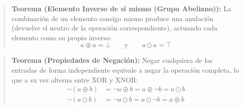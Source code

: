 \begin{quote}\textbf{Teorema (Elemento Inverso de sí mismo (Grupo Abeliano)):}\label{idemp_nula_xor}
La combinación de un elemento consigo mismo produce una anulación (devuelve el neutro de la operación correspondiente), actuando cada elemento como su propio inverso:
\[ a \oplus a = \bot \qquad \text{y} \qquad a \odot a = \top \]
\end{quote}

\begin{quote}\textbf{Teorema (Propiedades de Negación):}\label{negacion_xor}
Negar cualquiera de las entradas de forma independiente equivale a negar la operación completa, lo que a su vez alterna entre XOR y XNOR:
\begin{align*}
    \neg (a \oplus b) &= \neg a \oplus b = a \oplus \neg b = a \odot b \\
    \neg (a \odot b) &= \neg a \odot b = a \odot \neg b = a \oplus b
\end{align*}
\end{quote}

